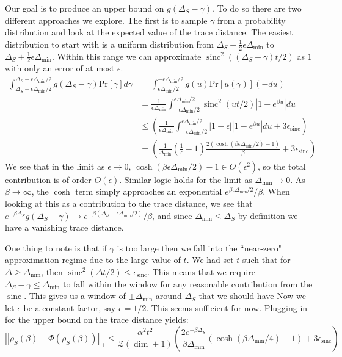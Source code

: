 \documentclass{article}
\newcommand{\parens}[1]{\left( #1 \right)}
\newcommand{\norm}[1]{\left| \left| #1 \right| \right|}
\newcommand{\prob}[1]{\text{Pr}\left[ #1 \right]}
\newcommand{\bigo}[1]{O\left( #1 \right)}
\newcommand{\partfun}{\mathcal{Z}}
\DeclareMathOperator{\sinc}{sinc}
\begin{document}
    Our goal is to produce an upper bound on $g(\Delta_S - \gamma)$. To do so there are two different approaches we explore. The first is to sample $\gamma$ from a probability distribution and look at the expected value of the trace distance. The easiest distribution to start with is a uniform distribution from $\Delta_S - \frac{1}{2} \epsilon \Delta_{\text{min}}$ to $\Delta_S + \frac{1}{2} \epsilon \Delta_{\text{min}}$. Within this range we can approximate $\sinc^2 ((\Delta_S - \gamma)t/2)$ as $1$ with only an error of at most $\epsilon$. 
    \begin{align}
        \int_{\Delta_S - \epsilon \Delta_{\text{min}}/2}^{\Delta_S + \epsilon \Delta_{\text{min}}/2} g(\Delta_S - \gamma) \prob{\gamma} d\gamma &= \int_{\epsilon \Delta_{\text{min}}/2}^{-\epsilon \Delta_{\text{min}}/2} g(u) \prob{u(\gamma)} (-du) \\
        &=\frac{1}{\epsilon \Delta_{\text{min}}} \int_{-\epsilon \Delta_{\text{min}}/2}^{\epsilon \Delta_{\text{min}}/2} \sinc^2(u t /2) |1 - e^{\beta u}| du \\
        &\leq  \parens{\frac{1}{\epsilon \Delta_{\text{min}}} \int_{-\epsilon \Delta_{\text{min}}/2}^{\epsilon \Delta_{\text{min}}/2} |1 - \epsilon| |1 - e^{\beta u}| du + 3 \epsilon_{\sinc}} \\
        &= \parens{\frac{1}{ \Delta_{\text{min}}} \parens{\frac{1}{\epsilon } - 1}\frac{2(\cosh (\beta \epsilon \Delta_{\text{min}}/2) - 1)  }{\beta} + 3 \epsilon_{\sinc}}
    \end{align}
    We see that in the limit as $\epsilon \to 0$, $\cosh(\beta \epsilon \Delta_{\min} /2) - 1 \in \bigo{\epsilon^2}$, so the total contribution is of order $\bigo{\epsilon}$. Similar logic holds for the limit as $\Delta_{\min} \to 0$. As $\beta \to \infty$, the $\cosh$ term simply approaches an exponential $e^{\beta \epsilon \Delta_{\min} /2} / \beta$. When looking at this as a contribution to the trace distance, we see that $e^{-\beta \Delta_S} g(\Delta_S - \gamma) \to e^{-\beta (\Delta_S - \epsilon \Delta_{\min}/2)} / \beta$, and since $\Delta_{\min} \leq \Delta_S$ by definition we have a vanishing trace distance.

    One thing to note is that if $\gamma$ is too large then we fall into the ``near-zero" approximation regime due to the large value of $t$. We had set $t$ such that for $\Delta \geq \Delta_{\min}$, then $\sinc^2(\Delta t/2) \leq \epsilon_{\sinc}$. This means that we require $\Delta_S - \gamma \leq \Delta_{\min}$ to fall within the window for any reasonable contribution from the $\sinc$. This gives us a window of $\pm \Delta_{\min}$ around $\Delta_S$ that we should have Now we let $\epsilon$ be a constant factor, say $\epsilon = 1/2$. This seems sufficient for now. Plugging in for the upper bound on the trace distance yields:
    \begin{equation}
        \norm{\rho_S(\beta) - \Phi(\rho_S(\beta))}_1 \leq \frac{\alpha^2 t^2}{\partfun (\dim + 1)} \parens{ \frac{2 e^{-\beta \Delta_S}}{\beta \Delta_{\min}} (\cosh(\beta \Delta_{\min} / 4) - 1) + 3 \epsilon_{\sinc} }
    \end{equation}
\end{document}
